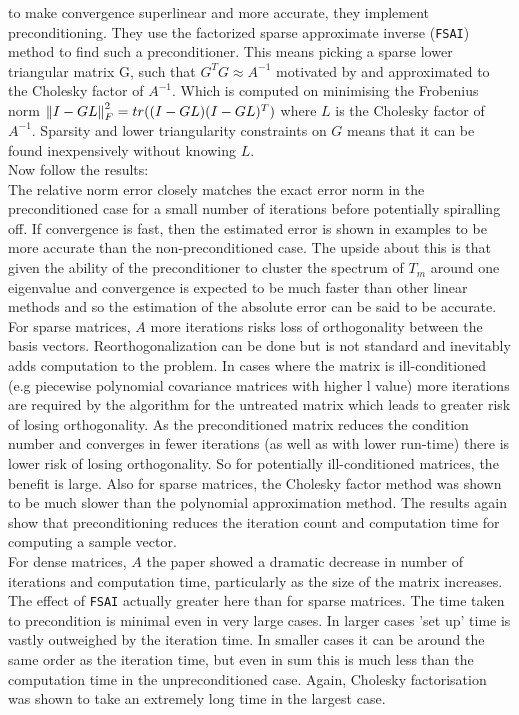 \documentclass[paper=a4, fontsize=12pt]{scrartcl} %
\numberwithin{equation}{section}       %
\numberwithin{figure}{section}         %
\numberwithin{table}{section}          %
\begin{document}
\indent to make convergence superlinear and more accurate, they implement preconditioning. They use the factorized sparse approximate inverse (\texttt{FSAI}) method to find such a preconditioner. This means picking a sparse lower triangular matrix G, such that $G^T G \approx A^{-1}$ motivated by and approximated to the Cholesky factor of $A^{-1}$. Which is computed on minimising the Frobenius norm 
$\norm{I - GL}_F^2 = tr((I-GL)(I-GL)^T)$
  where $L$ is the Cholesky factor of $A^{-1}$. Sparsity and lower triangularity constraints on $G$ means that it can be found inexpensively without knowing $L$.\\

Now follow the results: 
\\
\noindent The relative norm error closely matches the exact error norm in the preconditioned case for a small number of iterations before potentially spiralling off. If convergence is fast, then the estimated error is shown in examples to be more accurate than the non-preconditioned case. The upside about this is that given the ability of the preconditioner to cluster the spectrum of $T_m$ around one eigenvalue and convergence is expected to be much faster than other linear methods and so the estimation of the absolute error can be said to be accurate.\\ 

\noindent For sparse matrices, $A$ more iterations risks loss of orthogonality between the basis vectors. Reorthogonalization can be done but is not standard and inevitably adds
computation to the problem. In cases where the matrix is ill-conditioned (e.g piecewise polynomial covariance matrices with higher l value) more iterations are required by the algorithm for the untreated matrix which leads to greater risk of losing orthogonality. As the preconditioned matrix reduces the condition number
and converges in fewer iterations (as well as with lower run-time) there is lower risk of losing orthogonality. So for potentially ill-conditioned matrices, the benefit is large.
Also for sparse matrices, the Cholesky factor method was shown to be much slower than the polynomial approximation method. The results again show that preconditioning reduces the iteration count and computation time for computing a sample vector.\\

\noindent For dense matrices, $A$ the paper showed a dramatic decrease in number of iterations and computation time, particularly as the size of the matrix increases. The effect of \texttt{FSAI} actually greater
here than for sparse matrices. The time taken to precondition is minimal even in very large cases. In larger cases 'set up' time is vastly outweighed by the iteration time. In smaller cases it can be around the same order as the iteration time, but even in sum this is much less than the computation time in the unpreconditioned case.
Again, Cholesky factorisation was shown to take an extremely long time in the largest case.
\end{document}

